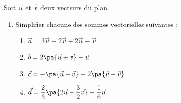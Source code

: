 \begin{exo}{}
	Soit $\vec{u}$ et $\vec{v}$ deux vecteurs du plan.
	\begin{enumerate}
		\item Simplifier chacune des sommes vectorielles suivantes :
		      \begin{enumerate}[itemsep=3mm]
			      \item $\vec{a} = 3\vec{u} - 2\vec{v} + 2\vec{u} - \vec{v}$
			      \item $\vec{b} = 2 \pa{\vec{u} + \vec{v}} - \vec{u}$
			      \item $\vec{c} = -\pa{\vec{u} + \vec{v}} + 2\pa{\vec{u} - \vec{v}}$
			      \item $\vec{d} = \dfrac{2}{3}\pa{2\vec{u} - \dfrac{3}{2}\vec{v}}-\dfrac{1}{6}\vec{u}$
		      \end{enumerate}
	\end{enumerate}
\end{exo}
